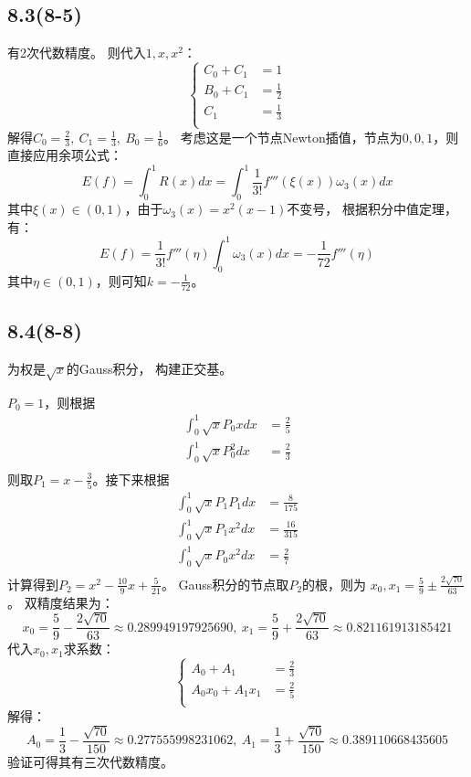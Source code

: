 \documentclass[UTF8,zihao=5]{ctexart}
\begin{document}
\subsection*{8.3(8-5)}
有2次代数精度。
则代入$1,x,x^2$：
$$
    \left\{
    \begin{array}{rl}
        C_0+C_1 & = 1          \\
        B_0+C_1 & =\frac{1}{2} \\
        C_1     & =\frac{1}{3} \\
    \end{array}
    \right.
$$
解得$C_0=\frac{2}{3},\ C_1=\frac{1}{3},\ B_0=\frac{1}{6}$。
考虑这是一个节点Newton插值，节点为$0,0,1$，则直接应用余项公式：
$$
    E(f)=\int_0^1{
    R(x)dx
    }=\int_0^1{
    \frac{1}{3!}f'''(\xi(x))\omega_3(x)dx
    }
$$
其中$\xi(x)\in(0,1)$，由于$\omega_3(x)=x^2(x-1)$不变号，
根据积分中值定理，有：
$$
    E(f)=\frac{1}{3!}f'''(\eta)\int_0^1{
    \omega_3(x)dx
    }
    =-\frac{1}{72}f'''(\eta)
$$
其中$\eta\in(0,1)$，则可知$k=-\frac{1}{72}$。




\subsection*{8.4(8-8)}
为权是$\sqrt{x}$的Gauss积分，
构建正交基。

$P_0=1$，则根据
$$
    \begin{aligned}
        \int_0^1{\sqrt{x}P_0x dx}  & = \frac{2}{5} \\
        \int_0^1{\sqrt{x}P_0^2 dx} & = \frac{2}{3} \\
    \end{aligned}
$$
则取$P_1=x-\frac{3}{5}$。接下来根据
$$
    \begin{aligned}
        \int_0^1{\sqrt{x}P_1P_1 dx} & = \frac{8}{175}  \\
        \int_0^1{\sqrt{x}P_1x^2 dx} & = \frac{16}{315} \\
        \int_0^1{\sqrt{x}P_0x^2 dx} & = \frac{2}{7}    \\
    \end{aligned}
$$
计算得到$P_2=x^2-\frac{10}{9}x+\frac{5}{21}$。
Gauss积分的节点取$P_2$的根，则为
$x_0,x_1=\frac{5}{9}\pm\frac{2\sqrt{70}}{63}$。
双精度结果为：
$$
    x_0=\frac{5}{9}-\frac{2\sqrt{70}}{63}\approx0.289949197925690,\
    x_1=\frac{5}{9}+\frac{2\sqrt{70}}{63}\approx0.821161913185421
$$
代入$x_0,x_1$求系数：
$$
    \left\{
    \begin{array}{rl}
        A_0+A_1       & = \frac{2}{3} \\
        A_0x_0+A_1x_1 & =\frac{2}{5}  \\
    \end{array}
    \right.
$$
解得：
$$
    A_0=\frac{1}{3}-\frac{\sqrt{70}}{150}\approx 0.277555998231062,\ 
    A_1=\frac{1}{3}+\frac{\sqrt{70}}{150}\approx 0.389110668435605
$$
验证可得其有三次代数精度。
\end{document}
